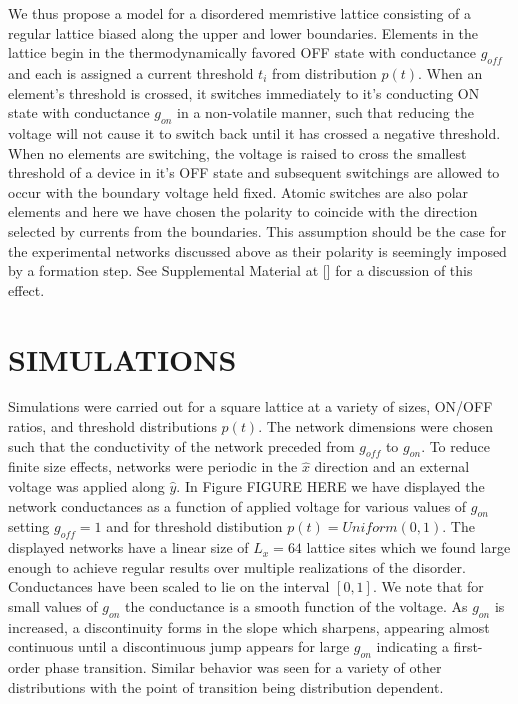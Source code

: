 \documentclass[aps,prl,reprint,groupedaddress]{revtex4-1}
\begin{document}
We thus propose a model for a disordered memristive lattice consisting of a
regular lattice biased along the upper and lower boundaries.  Elements in
the lattice begin in the thermodynamically favored OFF state with conductance
$g_{off}$ and each is assigned a current threshold $t_i$ from distribution
$p(t)$.  When an element's threshold is crossed, it switches immediately to
it's conducting ON state with conductance $g_{on}$ in a non-volatile manner,
such that reducing the voltage will not cause it to switch back until
it has crossed a negative threshold.  When no elements are
switching, the voltage is raised to cross the smallest threshold of a device
in it's OFF state and subsequent switchings are allowed to occur with the
boundary voltage held fixed.  Atomic switches are also polar elements and
here we have chosen the polarity to coincide with the direction selected by
currents from the boundaries.  This assumption should be the case for
the experimental networks discussed above as their polarity is seemingly
imposed by a formation step.  See Supplemental Material at []
for a discussion of this effect.

\section{SIMULATIONS}

Simulations were carried out for a square lattice at a variety of sizes,
ON/OFF ratios, and threshold distributions $p(t)$.  The network dimensions
were chosen such that the conductivity of the network preceded from $g_{off}$
to $g_{on}$.  To reduce finite size effects, networks were periodic in the
$\hat{x}$ direction and an external voltage was applied along $\hat{y}$. In
Figure FIGURE HERE we have displayed the network conductances as a function of
applied voltage for various values of $g_{on}$ setting $g_{off} = 1$ and for
threshold distibution $p(t) = Uniform(0,1)$.  The displayed networks have
a linear size of $L_x=64$ lattice sites which we found large enough to achieve
regular results over multiple realizations of the disorder. Conductances
have been scaled to lie on the interval $[0,1]$. We note that for small values
of $g_{on}$ the conductance is a smooth function of the voltage.  As $g_{on}$
is increased, a discontinuity forms in the slope which sharpens, appearing
almost continuous until a discontinuous jump appears for large $g_{on}$
indicating a first-order phase transition.  Similar behavior was seen for
a variety of other distributions with the point of transition being
distribution dependent.
\end{document}
